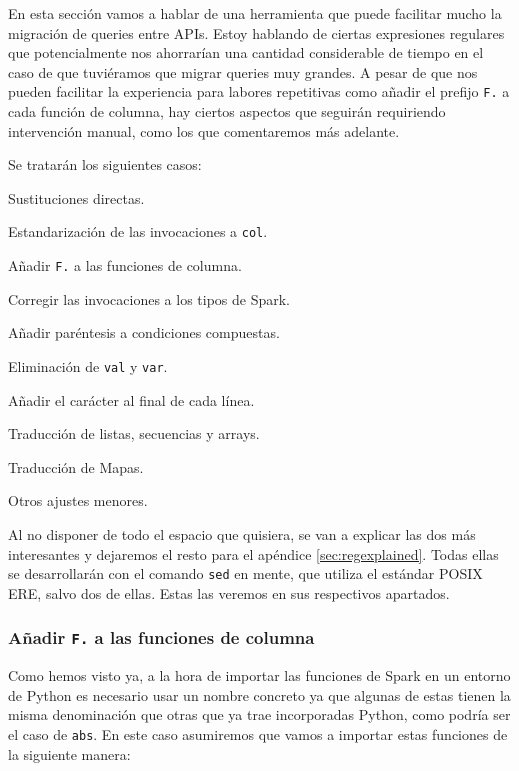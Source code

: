 \documentclass[12pt,twoside,titlepage]{report}
\begin{document}
En esta sección vamos a hablar de una herramienta que puede facilitar mucho la migración de queries entre APIs. Estoy hablando de ciertas expresiones regulares que potencialmente nos ahorrarían una cantidad considerable de tiempo en el caso de que tuviéramos que migrar queries muy grandes. A pesar de que nos pueden facilitar la experiencia para labores repetitivas como añadir el prefijo \texttt{F.} a cada función de columna, hay ciertos aspectos que seguirán requiriendo intervención manual, como los que comentaremos más adelante.

Se tratarán los siguientes casos:

\begin{compactitem}
	\item Sustituciones directas.
	\item Estandarización de las invocaciones a \texttt{col}.
	\item Añadir \texttt{F.} a las funciones de columna.
	\item Corregir las invocaciones a los tipos de Spark.
	\item Añadir paréntesis a condiciones compuestas.
	\item Eliminación de \texttt{val} y \texttt{var}.
	\item Añadir el carácter \texttt{} al final de cada línea.
	\item Traducción de listas, secuencias y arrays.
	\item Traducción de Mapas.
	\item Otros ajustes menores.
\end{compactitem}

Al no disponer de todo el espacio que quisiera, se van a explicar las dos más interesantes y dejaremos el resto para el apéndice \ref{sec:regexplained}. Todas ellas se desarrollarán con el comando \texttt{sed} en mente, que utiliza el estándar POSIX ERE, salvo dos de ellas. Estas las veremos en sus respectivos apartados.

\subsubsection{Añadir \texttt{F.} a las funciones de columna}

Como hemos visto ya, a la hora de importar las funciones de Spark en un entorno de Python es necesario usar un nombre concreto ya que algunas de estas tienen la misma denominación que otras que ya trae incorporadas Python, como podría ser el caso de \texttt{abs}. En este caso asumiremos que vamos a importar estas funciones de la siguiente manera:
\end{document}
